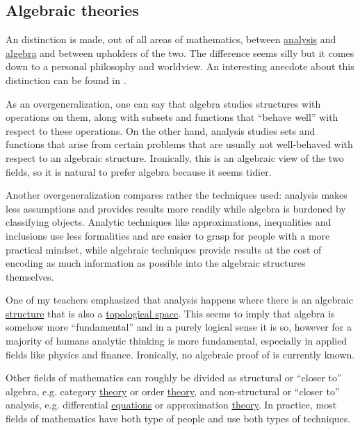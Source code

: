 \subsection{Algebraic theories}\label{subsec:algebraic_theories}

\begin{remark}\label{remark:algebra_vs_analysis}
  An distinction is made, out of all areas of mathematics, between \hyperref[sec:real_analysis]{analysis} and \hyperref[sec:group_theory]{algebra} and between upholders of the two. The difference seems silly but it comes down to a personal philosophy and worldview. An interesting anecdote about this distinction can be found in \cite{Tilly2010}.

  As an overgeneralization, one can say that algebra studies structures with operations on them, along with subsets and functions that \enquote{behave well} with respect to these operations. On the other hand, analysis studies sets and functions that arise from certain problems that are usually not well-behaved with respect to an algebraic structure. Ironically, this is an algebraic view of the two fields, so it is natural to prefer algebra because it seems tidier.

  Another overgeneralization compares rather the techniques used: analysis makes less assumptions and provides results more readily while algebra is burdened by classifying objects. Analytic techniques like approximations, inequalities and inclusions use less formalities and are easier to grasp for people with a more practical mindset, while algebraic techniques provide results at the cost of encoding as much information as possible into the algebraic structures themselves.

  One of my teachers emphasized that analysis happens where there is an algebraic \hyperref[def:algebraic_theory]{structure} that is also a \hyperref[def:topological_space]{topological space}. This seems to imply that algebra is somehow more \enquote{fundamental} and in a purely logical sense it is so, however for a majority of humans analytic thinking is more fundamental, especially in applied fields like physics and finance. Ironically, no algebraic proof of  is currently known.

  Other fields of mathematics can roughly be divided as structural or \enquote{closer to} algebra, e.g. category \hyperref[sec:category_theory]{theory} or order \hyperref[sec:order_theory]{theory}, and non-structural or \enquote{closer to} analysis, e.g. differential \hyperref[sec:diffeq]{equations} or approximation \hyperref[sec:approximation_theory]{theory}. In practice, most fields of mathematics have both type of people and use both types of techniques.
\end{remark}

